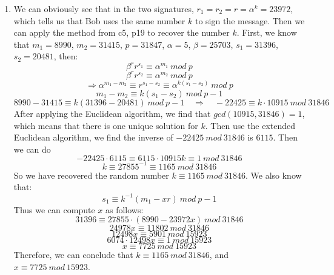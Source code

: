 \documentclass[12pt, a4paper]{article}
\begin{document}
\begin{enumerate}
\begin{enumerate}[a)]
          \end{enumerate}
    \item We can obviously see that in the two signatures, $r_1 = r_2 = r = \alpha^k = 23972$, 
          which tells us that Bob uses the same number $k$ to sign the message. 
          Then we can apply the method from c5, p19 to recover the number $k$. 
          First, we know that $m_1=8990$, $m_2=31415$, $p=31847$, $\alpha = 5$, $\beta = 25703$, $s_1 = 31396$, $s_2 = 20481$, then:
          $$\beta^r r^{s_1} \equiv \alpha^{m_1}\ mod\ p$$
          $$\beta^r r^{s_2} \equiv \alpha^{m_2}\ mod\ p$$
          $$\Rightarrow \alpha^{m_1 - m_2} \equiv r^{s_1 - s_2} \equiv \alpha^{k(s_1 - s_2)}\ mod\ p$$
          $$m_1 - m_2 \equiv k(s_1 - s_2)\ mod\ p-1$$
          $$8990 - 31415 \equiv k(31396 - 20481)\ mod\ p-1 \quad \Rightarrow \quad -22425 \equiv k\cdot 10915\ mod\ 31846$$
          After applying the Euclidean algorithm, we find that $gcd(10915, 31846) = 1$, 
          which means that there is one unique solution for $k$. 
          Then use the extended Euclidean algorithm, we find the inverse of $-22425\ mod\ 31846$ is $6115$. Then we can do
          $$-22425\cdot 6115 \equiv 6115 \cdot 10915k \equiv 1\ mod\ 31846$$
          $$k \equiv 27855^{-1} \equiv 1165\ mod\ 31846$$
          So we have recovered the random number $k \equiv 1165\ mod\ 31846$. 
          We also know that:
          $$s_1 \equiv k^{-1}(m_1 - xr)\ mod\ p-1$$
          Thus we can compute $x$ as follows:
          $$31396 \equiv 27855\cdot (8990 - 23972x)\ mod\ 31846$$
          $$24978x \equiv 11802\ mod\ 31846$$
          $$12498x \equiv 5901\ mod\ 15923$$
          $$6074\cdot 12498x \equiv 1\ mod\ 15923$$
          $$x \equiv 7725\ mod\ 15923$$
          Therefore, we can conclude that $k \equiv 1165\ mod\ 31846$, and $x \equiv 7725\ mod\ 15923$.
          
\end{enumerate}
\end{document}
